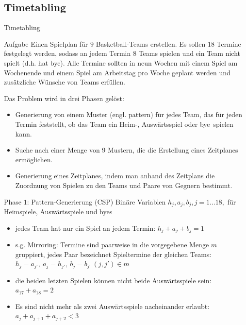 \documentclass[hyperref={pdfpagelabels=false}]{beamer}
\begin{document}
\subsection{Timetabling}
\begin{frame}[allowframebreaks]{Timetabling}
\nocite{Timetabling}
\small

\begin{block}{Aufgabe}
Einen Spielplan für $9$ Basketball-Teams erstellen. Es sollen $18$ Termine festgelegt werden, sodass an jedem Termin $8$ Teams spielen und ein Team nicht spielt (d.h. hat \glqq bye\grqq). Alle Termine sollten in neun Wochen mit einem Spiel am Wochenende und einem Spiel am Arbeitstag pro Woche geplant werden und zusätzliche Wünsche von Teams erfüllen.
\end{block}

\newpage

Das Problem wird in drei Phasen gelöst: \begin{itemize}
\setlength{\itemsep}{0pt}
\item Generierung von einem Muster (engl. pattern) für jedes Team, das für jeden Termin feststellt, ob das Team ein Heim-, Auswärtsspiel oder \glqq bye\grqq\ spielen kann. 
\item Suche nach einer Menge von 9 Mustern, die die Erstellung eines
Zeitplanes ermöglichen.
\item Generierung eines Zeitplanes, indem man anhand des Zeitplans die Zuordnung von Spielen zu den Teams und Paare von Gegnern bestimmt.
\end{itemize}

\newpage

\begin{block}{Phase $1$: Pattern-Generierung (CSP)}
Binäre Variablen $h_j, a_j, b_j, j=1\dots 18,$ für Heimspiele, Auswärtsspiele und byes 
\begin{itemize}
\setlength{\itemsep}{0pt}
\item jedes Team hat nur ein Spiel an jedem Termin: $h_j+a_j+b_j = 1$

\item s.g. Mirroring: Termine sind paarweise in die vorgegebene Menge $m$ gruppiert, jedes Paar bezeichnet Spieltermine der gleichen Teams: $h_j=a_{j'},\ a_j=h_{j'},\ b_j=b_{j'}\ (j, j')\in m$

\item die beiden letzten Spielen können nicht beide Auswärtsspiele sein: $a_{17}+a_{18} = 2$

\item Es sind nicht mehr als zwei Auswärtsspiele nacheinander erlaubt:\\ $a_j+a_{j+1}+a_{j+2}<3$ 


\end{itemize}
\end{block}
\end{frame}
\end{document}
